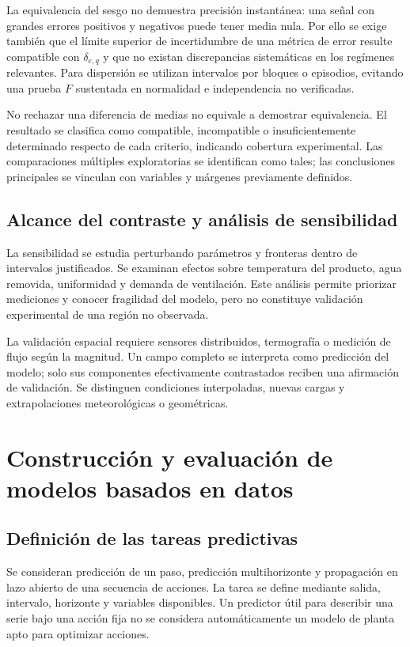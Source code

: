 La equivalencia del sesgo no demuestra precisión instantánea: una señal con grandes errores positivos y negativos puede tener media nula. Por ello se exige también que el límite superior de incertidumbre de una métrica de error resulte compatible con $\delta_{e,q}$ y que no existan discrepancias sistemáticas en los regímenes relevantes. Para dispersión se utilizan intervalos por bloques o episodios, evitando una prueba $F$ sustentada en normalidad e independencia no verificadas.

No rechazar una diferencia de medias no equivale a demostrar equivalencia. El resultado se clasifica como compatible, incompatible o insuficientemente determinado respecto de cada criterio, indicando cobertura experimental. Las comparaciones múltiples exploratorias se identifican como tales; las conclusiones principales se vinculan con variables y márgenes previamente definidos.

\subsection{Alcance del contraste y análisis de sensibilidad}

La sensibilidad se estudia perturbando parámetros y fronteras dentro de intervalos justificados. Se examinan efectos sobre temperatura del producto, agua removida, uniformidad y demanda de ventilación. Este análisis permite priorizar mediciones y conocer fragilidad del modelo, pero no constituye validación experimental de una región no observada.

La validación espacial requiere sensores distribuidos, termografía o medición de flujo según la magnitud. Un campo completo se interpreta como predicción del modelo; solo sus componentes efectivamente contrastados reciben una afirmación de validación. Se distinguen condiciones interpoladas, nuevas cargas y extrapolaciones meteorológicas o geométricas.

\section{Construcción y evaluación de modelos basados en datos}
\label{met:ml}

\subsection{Definición de las tareas predictivas}

Se consideran predicción de un paso, predicción multihorizonte y propagación en lazo abierto de una secuencia de acciones. La tarea se define mediante salida, intervalo, horizonte y variables disponibles. Un predictor útil para describir una serie bajo una acción fija no se considera automáticamente un modelo de planta apto para optimizar acciones.

